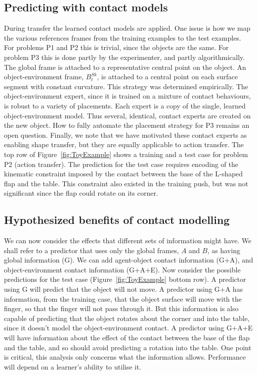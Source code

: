 \subsection{Predicting with contact models}
During transfer the learned contact models are applied. One issue is how we map the various references frames from the training examples to the test examples. For problems P1 and P2 this is trivial, since the objects are the same. For problem P3 this is done partly by the experimenter, and partly algorithmically. The global frame is attached to a representative central point on the object. An object-environment frame, $B^{Sk}_t$, is attached to a central point on each surface segment with constant curvature. This strategy was determined empirically. The object-environment expert, since it is trained on a mixture of contact behaviours, is robust to a variety of placements. 
Each expert is a copy of the single, learned object-environment model. Thus several, identical, contact experts are created on the new object. How to fully automate the placement strategy for P3 remains an open question. Finally, we note that we have motivated these contact experts as enabling shape transfer, but they are equally applicable to action transfer. The top row of Figure~\ref{fig:ToyExample} shows a training and a test case for problem P2 (action transfer). The prediction for the test case requires encoding of the kinematic constraint imposed by the contact between the base of the L-shaped flap and the table. This constraint also existed in the training push, but was not significant since the flap could rotate on its corner.

\subsection{Hypothesized benefits of contact modelling}
We can now consider the effects that different sets of information might have. We shall refer to a predictor that uses only the global frames, $A$ and $B$, as having global information (G). We can add agent-object contact information (G+A), and object-environment contact information (G+A+E). Now consider the possible predictions for the test case (Figure~\ref{fig:ToyExample} bottom row). A predictor using G will predict that the object will not move. A predictor using G+A has information, from the training case, that the object surface will move with the finger, so that the finger will not pass through it. But this information is also capable of predicting that the object rotates about the corner and into the table, since it doesn't model the object-environment contact. A predictor using G+A+E will have information about the effect of the contact between the base of the flap and the table, and so should avoid predicting a rotation into the table.
One point is critical, this analysis only concerns what the information allows. Performance will depend on a learner's ability to utilise it.  

